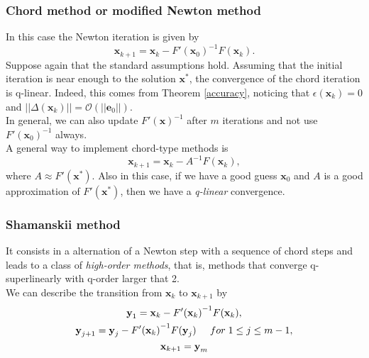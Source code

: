 \subsubsection{Chord method or modified Newton method} In this case the Newton iteration is given by
\begin{equation*}
{\textbf{x}}_{k+1} = {\textbf{x}}_{k} - F'({\textbf{x}}_{0})^{-1} F({\textbf{x}}_{k}) .
\end{equation*}
Suppose again that the standard assumptions hold. Assuming that the initial iteration is near enough to the solution ${\textbf{x}}^{*}$, the convergence of the chord iteration is q-linear. Indeed, this comes from Theorem \ref{accuracy}, noticing that $\epsilon(\textbf{x}_k) = 0$ and $||\Delta(\textbf{x}_k)|| = \mathcal{O}(||\textbf{e}_0||)$.\\
 In general, we can also update $F'(\textbf{x})^{-1}$ after $m$ iterations and not use $F'({\textbf{x}}_{0})^{-1}$ always.\\
A general way to implement chord-type methods is 
\begin{equation*}
{\textbf{x}}_{k+1} = {\textbf{x}}_{k} - {A}^{-1} F({\textbf{x}}_{k}), 
\end{equation*}
where $A \approx F'({\textbf{x}}^{*})$. Also in this case, if we have a good guess ${\textbf{x}}_{0}$ and $A$ is a good approximation of $ F'({\textbf{x}}^{*})$, then we have a \textit{q-linear} convergence. \\

\subsubsection{Shamanskii method} It consists in a alternation of a Newton step with a sequence of chord steps and leads to a class of \textit{high-order methods}, that is, methods that converge q-superlinearly with q-order larger that 2. \\
We can describe the transition from ${\textbf{x}}_{k}$ to ${\textbf{x}}_{k+1}$ by
\begin{gather*}
{\textbf{y}}_{1} = {\textbf{x}}_{k} -{F'({\textbf{x}}_{k})}^{-1}F({\textbf{x}}_{k}),\\
{\textbf{\textbf{y}}}_{j+1} = {\textbf{y}}_{j} -{F'({\textbf{x}}_{k})}^{-1}F({\textbf{y}}_{j}) \; \; \; \; \; for\; 1\leq j \leq m-1, \\
{\textbf{x}}_{k+1} = {\textbf{y}}_{m}
\end{gather*}

